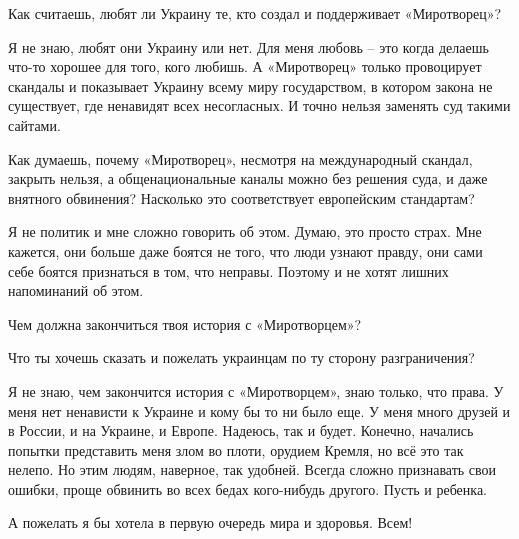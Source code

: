 Как считаешь, любят ли Украину те, кто создал и поддерживает «Миротворец»?

Я не знаю, любят они Украину или нет. Для меня любовь – это когда делаешь
что-то хорошее для того, кого любишь. А «Миротворец» только провоцирует
скандалы и показывает Украину всему миру государством, в котором закона не
существует, где ненавидят всех несогласных. И точно нельзя заменять суд такими
сайтами.

Как думаешь, почему «Миротворец», несмотря на международный скандал, закрыть
нельзя, а общенациональные каналы можно без решения суда, и даже внятного
обвинения? Насколько это соответствует европейским стандартам?

Я не политик и мне сложно говорить об этом. Думаю, это просто страх. Мне
кажется, они больше даже боятся не того, что люди узнают правду, они сами себе
боятся признаться в том, что неправы. Поэтому и не хотят лишних напоминаний об
этом.

Чем должна закончиться твоя история с «Миротворцем»?

Что ты хочешь сказать и пожелать украинцам по ту сторону разграничения?

Я не знаю, чем закончится история с «Миротворцем», знаю только, что права. У
меня нет ненависти к Украине и кому бы то ни было еще. У меня много друзей и в
России, и на Украине, и Европе. Надеюсь, так и будет. Конечно, начались попытки
представить меня злом во плоти, орудием Кремля, но всё это так нелепо. Но этим
людям, наверное, так удобней. Всегда сложно признавать свои ошибки, проще
обвинить во всех бедах кого-нибудь другого. Пусть и ребенка.

А пожелать я бы хотела в первую очередь мира и здоровья. Всем!

